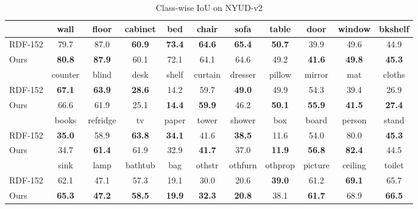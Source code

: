 \begin{table}[h]  
	\caption{Class-wise IoU on NYUD-v2}  
	\centering
	\normalsize
	\begin{tabular*}{16.3cm}{l|cccccccccc}  
		\hline		
		&wall &floor &cabinet &bed &chair&sofa& table& door & window& bkshelf\\   
		\hline  
		RDF-152 & 79.7 & 87.0 & \bf{60.9} & \bf{73.4}& \bf{64.6}& \bf{65.4}& \bf{50.7}& 39.9 & 49.6& 44.9\\
		Ours & \bf{80.8} & \bf{87.9} & 60.1 & 72.1& 64.1& 64.6 & 49.2 & \bf{41.6}
		& \bf{49.8}& \bf{45.3}\\
		\hline  
		\hline 
		 & counter & blind & desk& shelf&curtain& dresser& pillow& mirror& mat&cloths\\
		\hline 
		RDF-152& \bf{67.1}& \bf{63.9}& \bf{28.6}& 14.2 & 59.7&\bf{49.0} & 49.9 & 54.3& 39.4 & 26.9 \\
		Ours  & 66.6 & 61.9 & 25.1& \bf{14.4}& \bf{59.9} & 46.2 & \bf{50.1} & \bf{55.9}& \bf{41.5}&\bf{27.4}\\
		\hline 
		\hline 
		& books& refridge& tv&paper& tower& shower& box& board&person& stand\\ 
		\hline 
		RDF-152 & \bf{35.0} & 58.9& \bf{63.8} & \bf{34.1} & 41.6 & \bf{38.5} & 11.6& 54.0& 80.0 & \bf{45.3}\\ 
		Ours& 34.7 & \bf{61.4} & 61.9& 32.9 & \bf{41.7} & 37.0 & \bf{11.9}& \bf{56.8}& \bf{82.4} & 44.5\\
		\hline 
		\hline 
		& sink& lamp&bathtub& bag& othstr& othfurn& othprop& picture& ceiling& toilet\\
		\hline
		RDF-152   & 62.1& 47.1& 57.3 & 19.1 & 30.0 & 20.6& \bf{39.0}& 61.2& \bf{69.1}& 65.7\\
		Ours & \bf{65.3}& \bf{47.2}& \bf{58.5} & \bf{19.9} & \bf{32.3} & \bf{20.8}& 38.1& \bf{61.7}& 68.9 & \bf{66.5}\\
		\hline 
		\hline
	\end{tabular*}
	\label{Tab:Results_classes}
\end{table}


